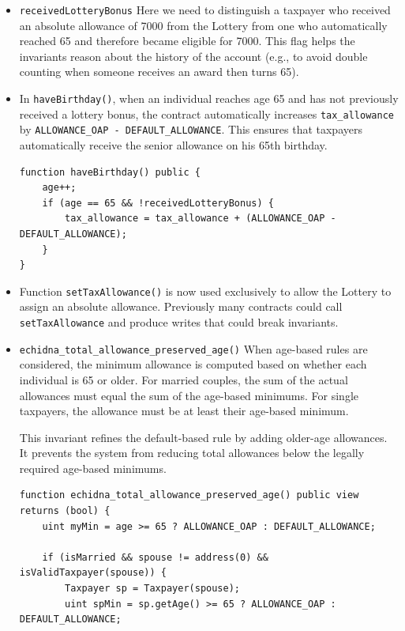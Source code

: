 \begin{itemize}
    \item \texttt{receivedLotteryBonus} Here we need to distinguish a taxpayer who received an absolute allowance of 7000 from the Lottery from one who automatically reached 65 and therefore became eligible for 7000. This flag helps the invariants reason about the history of the account (e.g., to avoid double counting when someone receives an award then turns 65).
    
    \item In \texttt{haveBirthday()}, when an individual reaches age 65 and has not previously received a lottery bonus, the contract automatically increases \texttt{tax\_allowance} by \texttt{ALLOWANCE\_OAP - DEFAULT\_ALLOWANCE}.
    This ensures that taxpayers automatically receive the senior allowance on his 65th birthday.

    \begin{lstlisting}
function haveBirthday() public {
    age++;
    if (age == 65 && !receivedLotteryBonus) {
        tax_allowance = tax_allowance + (ALLOWANCE_OAP - DEFAULT_ALLOWANCE);
    }
}
    \end{lstlisting}
    
    \item Function \texttt{setTaxAllowance()} is now used exclusively to allow the Lottery to assign an absolute allowance. Previously many contracts could call \texttt{setTaxAllowance} and produce writes that could break invariants.
    
    \item \texttt{echidna\_total\_allowance\_preserved\_age()} When age-based rules are considered, the minimum allowance is computed based on whether each individual is 65 or older. For married couples, the sum of the actual allowances must equal the sum of the age-based minimums. For single taxpayers, the allowance must be at least their age-based minimum.

    This invariant refines the default-based rule by adding older-age allowances. It prevents the system from reducing total allowances below the legally required age-based minimums.

    \begin{lstlisting}
function echidna_total_allowance_preserved_age() public view returns (bool) {
    uint myMin = age >= 65 ? ALLOWANCE_OAP : DEFAULT_ALLOWANCE;

    if (isMarried && spouse != address(0) && isValidTaxpayer(spouse)) {
        Taxpayer sp = Taxpayer(spouse);
        uint spMin = sp.getAge() >= 65 ? ALLOWANCE_OAP : DEFAULT_ALLOWANCE;


\end{lstlisting}
\end{itemize}
